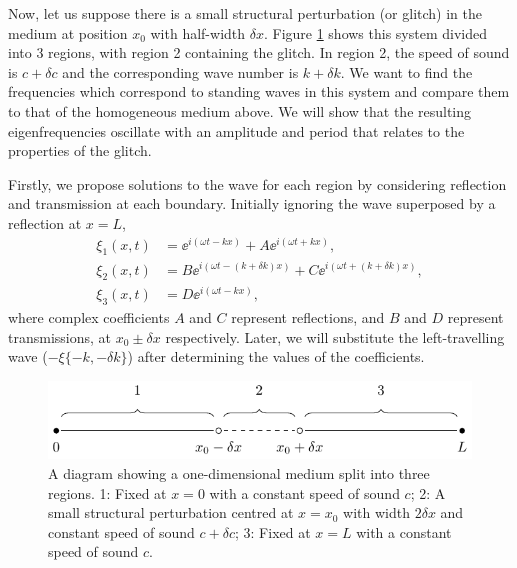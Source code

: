 Now, let us suppose there is a small structural perturbation (or glitch) in the medium at position \(x_0\) with half-width \(\delta x\). Figure \ref{fig:1d-diagram} shows this system divided into 3 regions, with region 2 containing the glitch. In region 2, the speed of sound is \(c + \delta c\) and the corresponding wave number is \(k + \delta k\). We want to find the frequencies which correspond to standing waves in this system and compare them to that of the homogeneous medium above. We will show that the resulting eigenfrequencies oscillate with an amplitude and period that relates to the properties of the glitch.

Firstly, we propose solutions to the wave for each region by considering reflection and transmission at each boundary. Initially ignoring the wave superposed by a reflection at \(x=L\),
%
\begin{align}
    \xi_1(x, t) &= \ee^{i(\omega t - k x)} + A \ee^{i(\omega t + k x)}, \label{eq:xi1-r} \\
    \xi_2(x, t) &= B\ee^{i(\omega t - (k + \delta k) x)} + C \ee^{i(\omega t + (k + \delta k) x)}, \label{eq:xi2-r} \\
    \xi_3(x, t) &= D \ee^{i(\omega t - k x)}, \label{eq:xi3-r}
\end{align}
%
where complex coefficients \(A\) and \(C\) represent reflections, and \(B\) and \(D\) represent transmissions, at \(x_0 \pm \delta x\) respectively. Later, we will substitute the left-travelling wave (\(- \xi\{-k, -\delta k\}\)) after determining the values of the coefficients.

\begin{figure}
    \centering
    \includegraphics{figures/glitch-1d-example-diagram.pdf}
    \caption[A diagram showing a one-dimensional medium with a small structural perturbation.]{A diagram showing a one-dimensional medium split into three regions. 1: Fixed at \(x=0\) with a constant speed of sound \(c\); 2: A small structural perturbation centred at \(x=x_0\) with width \(2\delta x\) and constant speed of sound \(c + \delta c\); 3: Fixed at \(x=L\) with a constant speed of sound \(c\).}
    \label{fig:1d-diagram}
\end{figure}

